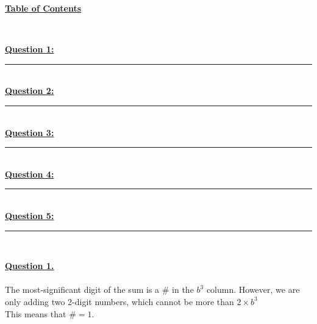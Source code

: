\documentclass[12pt]{article}
\begin{document}
\begin{center}
	\hypertarget{toc}{\LARGE \noindent \underline{\textbf{Table of Contents}}}\\
\end{center}

\noindent \hyperlink{1}{\textbf{Question 1:}}
\vspace{1mm}
\hrule
\vspace{1mm} \leavevmode \\

\noindent \hyperlink{2}{\textbf{Question 2:}}
\vspace{1mm}
\hrule
\vspace{1mm} \leavevmode \\

\noindent \hyperlink{3}{\textbf{Question 3:}}
\vspace{1mm}
\hrule
\vspace{1mm} \leavevmode \\

\noindent \hyperlink{4}{\textbf{Question 4:}}
\vspace{1mm}
\hrule
\vspace{1mm} \leavevmode \\

\noindent \hyperlink{5}{\textbf{Question 5:}}
\vspace{1mm}
\hrule
\vspace{1mm} \leavevmode \\
\newpage

\noindent \hyperlink{toc}{\hypertarget{1}{\LARGE \underline{\textbf{Question 1.}}}}\\\\
The most-significant digit of the sum is a $\#$ in the $b^3$ column. However, we are only adding two 2-digit numbers, which cannot be more than $2\times b^3$\\
This means that $\# = 1$.\\
\end{document}
